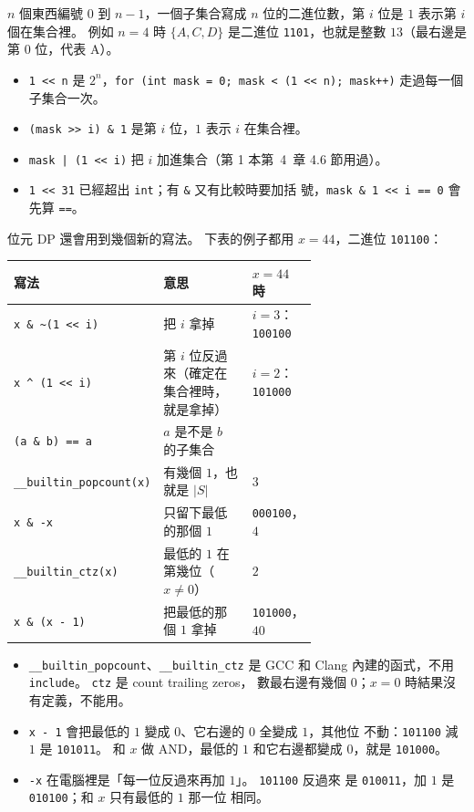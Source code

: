 \begin{prevbookrecap}[第~4~章 4.2 節：位元遮罩]
$n$ 個東西編號 $0$ 到 $n - 1$，一個子集合寫成 $n$ 位的二進位數，第 $i$ 位是
$1$ 表示第 $i$ 個在集合裡。 例如 $n = 4$ 時 $\{A, C, D\}$ 是二進位
\texttt{1101}，也就是整數 $13$（最右邊是第 $0$ 位，代表 A）。
\begin{itemize}
\item \texttt{1 << n} 是 $2^n$，\texttt{for (int mask = 0; mask < (1 << n); mask++)}
走過每一個子集合一次。
\item \texttt{(mask >> i) \& 1} 是第 $i$ 位，$1$ 表示 $i$ 在集合裡。
\item \texttt{mask | (1 << i)} 把 $i$ 加進集合（第 1 本第~4~章 4.6 節用過）。
\item \texttt{1 << 31} 已經超出 \texttt{int}；有 \texttt{\&} 又有比較時要加括
號，\texttt{mask \& 1 << i == 0} 會先算 \texttt{==}。
\end{itemize}
\end{prevbookrecap}

位元 DP 還會用到幾個新的寫法。 下表的例子都用 $x = 44$，二進位
\texttt{101100}：

\begin{center}
\begin{tabular}{p{0.3\linewidth}p{0.36\linewidth}l}
\toprule
寫法 & 意思 & $x = 44$ 時 \\
\midrule
\texttt{x \& \textasciitilde(1 << i)} & 把 $i$ 拿掉 & $i = 3$：\texttt{100100} \\
\texttt{x \^{} (1 << i)} & 第 $i$ 位反過來（確定在集合裡時，就是拿掉） & $i = 2$：\texttt{101000} \\
\texttt{(a \& b) == a} & $a$ 是不是 $b$ 的子集合 & \\
\texttt{\_\_builtin\_popcount(x)} & 有幾個 $1$，也就是 $|S|$ & $3$ \\
\texttt{x \& -x} & 只留下最低的那個 $1$ & \texttt{000100}，$4$ \\
\texttt{\_\_builtin\_ctz(x)} & 最低的 $1$ 在第幾位（$x \ne 0$） & $2$ \\
\texttt{x \& (x - 1)} & 把最低的那個 $1$ 拿掉 & \texttt{101000}，$40$ \\
\bottomrule
\end{tabular}
\end{center}

\begin{itemize}
\item \texttt{\_\_builtin\_popcount}、\texttt{\_\_builtin\_ctz} 是 GCC 和 Clang
內建的函式，不用 \texttt{include}。 \texttt{ctz} 是 count trailing zeros，
數最右邊有幾個 $0$；$x = 0$ 時結果沒有定義，不能用。
\item \texttt{x - 1} 會把最低的 $1$ 變成 $0$、它右邊的 $0$ 全變成 $1$，其他位
不動：\texttt{101100} 減 $1$ 是 \texttt{101011}。 和 $x$ 做 AND，最低的 $1$
和它右邊都變成 $0$，就是 \texttt{101000}。
\item \texttt{-x} 在電腦裡是「每一位反過來再加 $1$」。 \texttt{101100} 反過來
是 \texttt{010011}，加 $1$ 是 \texttt{010100}；和 $x$ 只有最低的 $1$ 那一位
相同。
\end{itemize}

